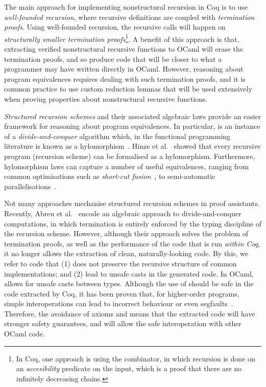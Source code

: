 \documentclass[anonymous, a4paper, UKenglish, cleveref, autoref, thm-restate]{lipics-v2021}
\begin{document}
The main approach for implementing nonstructural recursion in Coq is to use
\emph{well-founded recursion}, where recursive definitions are coupled with
\emph{termination proofs}.  Using well-founded recursion, the recursive calls
will happen on \emph{structurally smaller termination proofs}\footnote{In Coq,
one approach is using the  combinator, in which recursion is done on
an \emph{accesibility} predicate on the input, which is a proof that there are
no infinitely decreasing chains.}. A benefit of this approach is that,
extracting verified nonstructural recursive functions to OCaml will erase the
termination proofs, and so produce code that will be closer to what a
programmer may have written directly in OCaml. However, reasoning about program
equivalences requires dealing with such termination proofs, and it is common
practice to use custom reduction lemmas that will be used extensively when
proving properties about nonstructural recursive functions.

\emph{Structured recursion schemes} and their associated algebraic laws provide
an easier framework for reasoning about program equivalences.  In particular,
 is an instance of a \emph{divide-and-conquer}
algorithm which, in the functional programming literature is known as a
hylomorphism~\cite{MeijerFP91, HuIT96}.  Hinze et al.~\cite{HinzeWG15} showed
that every recursive program (recursion scheme) can be formalised as a hylomorphism.
Furthermore, hylomorphism laws can capture a number of useful equivalences,
ranging from common optimisations such as \emph{short-cut
fusion}~\cite{TakanoM95}, to semi-automatic
parallelisations~\cite{Gibbons96:Third, farmsCastro}.

Not many approaches mechanise structured recursion
schemes in proof assistants.  Recently, Abreu et al.~\cite{AbreuDHJMS23} encode
an algebraic approach to divide-and-conquer computations, in which termination
is entirely enforced by the typing discipline of the recursion scheme. However,
although their approach solves the problem of termination proofs, as well as
the performance of the code that is run \emph{within Coq}, it no longer allows
the extraction of clean, naturally-looking code.  By this, we refer to code
that (1) does not preserve the recursive structure of common implementations;
and (2) lead to unsafe casts  in the generated code. 
In OCaml,  allows for unsafe casts between types.
Although the use of  should be safe in the code
extracted by Coq, it has been proven that, for higher-order programs, simple
interoperations can lead to incorrect behaviour or even
segfaults~\cite{forster:hal-04329663}. Therefore, the avoidance of axioms and
 means that the extracted code will have stronger
safety guarantees, and will allow the safe interoperation with other OCaml
code.
\end{document}
